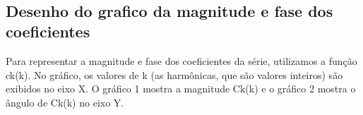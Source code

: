 \documentclass{article}
\begin{document}
    \begin{center}
    \end{center}
    { \hspace*{\fill} \\}
    
    \hypertarget{desenho-do-grafico-da-magnitude-e-fase-dos-coeficientes}{%
\subsection{Desenho do grafico da magnitude e fase dos
coeficientes}\label{desenho-do-grafico-da-magnitude-e-fase-dos-coeficientes}}

Para representar a magnitude e fase dos coeficientes da série,
utilizamos a função ck(k). No gráfico, os valores de k (as harmônicas,
que são valores inteiros) são exibidos no eixo X. O gráfico 1 mostra a
magnitude \textbar Ck(k)\textbar{} e o gráfico 2 mostra o ângulo de
Ck(k) no eixo Y.
\end{document}
